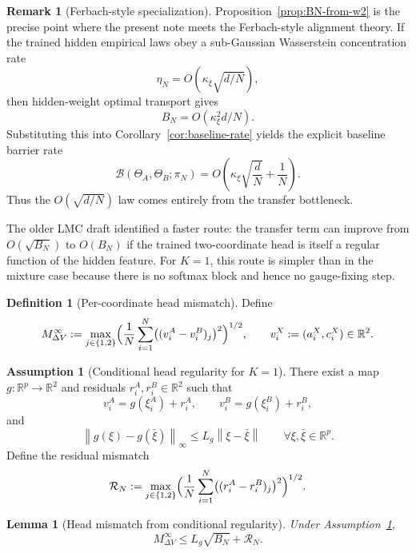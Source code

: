 \documentclass[11pt]{article}
\newtheorem{lemma}[theorem]{Lemma}
\theoremstyle{definition}
\newtheorem{definition}[theorem]{Definition}
\newtheorem{assumption}[theorem]{Assumption}
\newtheorem{remark}[theorem]{Remark}
\newcommand{\R}{\mathbb{R}}
\newcommand{\norm}[1]{\left\lVert #1 \right\rVert}
\newcommand{\cB}{\mathcal{B}}
\begin{document}
\begin{remark}[Ferbach-style specialization]
Proposition~\ref{prop:BN-from-w2} is the precise point where the present note
meets the Ferbach-style alignment theory. If the trained hidden empirical laws
obey a sub-Gaussian Wasserstein concentration rate
\[
  \eta_N=O(\kappa_\xi\sqrt{d/N}),
\]
then hidden-weight optimal transport gives
\[
  B_N = O(\kappa_\xi^2 d/N).
\]
Substituting this into Corollary~\ref{cor:baseline-rate} yields the explicit
baseline barrier rate
\[
  \cB(\Theta_A,\Theta_B;\pi_N)
  =
  O\!\left(\kappa_\xi\sqrt{\frac{d}{N}} + \frac1N\right).
\]
Thus the $O(\sqrt{d/N})$ law comes entirely from the transfer bottleneck.
\end{remark}

The older LMC draft identified a faster route: the transfer term can improve
from $O(\sqrt{B_N})$ to $O(B_N)$ if the trained two-coordinate head is itself a
regular function of the hidden feature. For $K=1$, this route is simpler than
in the mixture case because there is no softmax block and hence no gauge-fixing
step.

\begin{definition}[Per-coordinate head mismatch]
\label{def:head-mismatch}
Define
\[
  M_{\Delta V}^\infty
  :=
  \max_{j\in\{1,2\}}
  \Bigl(
    \frac1N\sum_{i=1}^N
    \bigl((v_i^A-v_i^B)_j\bigr)^2
  \Bigr)^{1/2},
  \qquad
  v_i^X:=(a_i^X,c_i^X)\in\R^2.
\]
\end{definition}

\begin{assumption}[Conditional head regularity for $K=1$]
\label{ass:head-regularity-k1}
There exist a map $g:\R^p\to\R^2$ and residuals $r_i^A,r_i^B\in\R^2$ such that
\[
  v_i^A = g(\xi_i^A)+r_i^A,
  \qquad
  v_i^B = g(\xi_i^B)+r_i^B,
\]
and
\[
  \norm{g(\xi)-g(\bar\xi)}_\infty \le L_g \norm{\xi-\bar\xi}
  \qquad
  \forall \xi,\bar\xi\in\R^p.
\]
Define the residual mismatch
\[
  \mathcal R_N
  :=
  \max_{j\in\{1,2\}}
  \Bigl(
    \frac1N\sum_{i=1}^N
    \bigl((r_i^A-r_i^B)_j\bigr)^2
  \Bigr)^{1/2}.
\]
\end{assumption}

\begin{lemma}[Head mismatch from conditional regularity]
\label{lem:head-mismatch-regular}
Under Assumption~\ref{ass:head-regularity-k1},
\begin{equation}
  M_{\Delta V}^\infty
  \le
  L_g \sqrt{B_N} + \mathcal R_N.
  \label{eq:head-mismatch-regular}
\end{equation}
\end{lemma}
\end{document}
